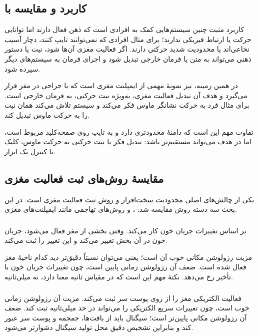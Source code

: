 \subsection{کاربرد  و مقایسه با }
کاربرد مثبت چنین سیستم‌هایی کمک به افرادی است که ذهن فعال دارند اما توانایی حرکت یا ارتباط فیزیکی ندارند؛ برای مثال افرادی که نمی‌توانند تایپ کنند، دچار آسیب نخاعی‌اند یا محدودیت شدید حرکتی دارند. اگر فعالیت مغزی آن‌ها  شود، نیت یا دستور ذهنی می‌تواند به متن یا فرمان خارجی تبدیل شود و اجرای فرمان به سیستم‌های دیگر سپرده شود.

در همین زمینه،  نیز نمونهٔ مهمی از ایمپلنت مغزی است که با جراحی در مغز قرار می‌گیرد و هدف آن تبدیل فعالیت مغزی، به‌ویژه نیت حرکتی، به فرمان خارجی است. برای مثال فرد به حرکت نشانگر ماوس فکر می‌کند و سیستم تلاش می‌کند همان نیت را به حرکت ماوس تبدیل کند.

تفاوت مهم این است که  دامنهٔ محدودتری دارد و به تایپ روی صفحه‌کلید مربوط است، اما در  هدف می‌تواند مستقیم‌تر باشد: تبدیل فکر یا نیت حرکتی به حرکت ماوس، کلیک یا کنترل یک ابزار.

\subsection{مقایسهٔ روش‌های ثبت فعالیت مغزی}
یکی از چالش‌های اصلی  محدودیت سخت‌افزار و روش ثبت فعالیت مغزی است. در این بحث سه دسته روش مقایسه شد: ،  و روش‌های تهاجمی مانند ایمپلنت‌های مغزی.

\subsubsection{}
 بر اساس تغییرات جریان خون کار می‌کند. وقتی بخشی از مغز فعال می‌شود، جریان خون در آن بخش تغییر می‌کند و  این تغییر را ثبت می‌کند.

مزیت  رزولوشن مکانی خوب آن است؛ یعنی می‌توان نسبتاً دقیق‌تر دید کدام ناحیهٔ مغز فعال شده است. ضعف آن رزولوشن زمانی پایین است، چون تغییرات جریان خون با تأخیر رخ می‌دهد. نکتهٔ مهم این است که  در مقیاس ثانیه معنا دارد، نه میلی‌ثانیه.

\subsubsection{}
 فعالیت الکتریکی مغز را از روی پوست سر ثبت می‌کند. مزیت آن رزولوشن زمانی خوب است، چون تغییرات سریع الکتریکی را می‌تواند در حد میلی‌ثانیه ثبت کند. ضعف آن رزولوشن مکانی پایین‌تر است؛ سیگنال باید از بافت‌ها، جمجمه و پوست سر عبور کند و بنابراین تشخیص دقیق محل تولید سیگنال دشوارتر می‌شود.

